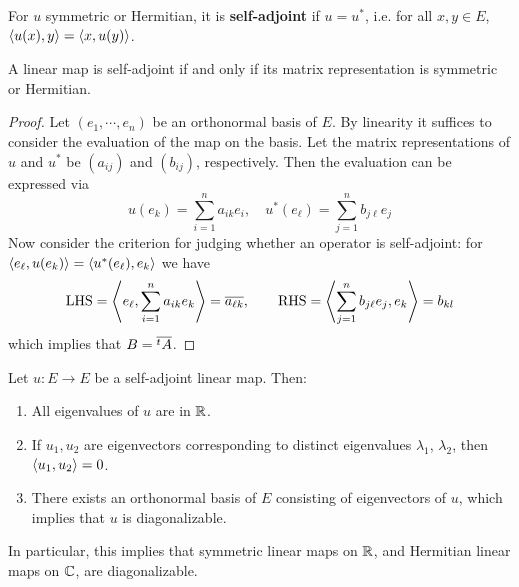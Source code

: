 \begin{definition}
    For $u$ symmetric or Hermitian, it is \textbf{self-adjoint} if $u = u^{\ast}$, i.e. for all $x, y \in E$, $\left\langle u(x), y \right\rangle = \left\langle x, u(y) \right\rangle$.
\end{definition}

\begin{proposition}
    A linear map is self-adjoint if and only if its matrix representation is symmetric or Hermitian.
\end{proposition}

\begin{proof}
    Let $(e_1, \cdots, e_n)$ be an orthonormal basis of $E$. By linearity it suffices to consider the evaluation of the map on the basis. Let the matrix representations of $u$ and $u^{\ast}$ be $(a_{ij})$ and $(b_{ij})$, respectively. Then the evaluation can be expressed via
    \[
        u(e_k) = \sum\limits_{i=1}^n a_{ik} e_i, \quad u^{\ast} (e_{\ell}) = \sum\limits_{j=1}^n b_{j \ell} e_j
    \]
    Now consider the criterion for judging whether an operator is self-adjoint: for $\left\langle e_{\ell}, u(e_k) \right\rangle = \left\langle u^{\ast}(e_{\ell}), e_k \right\rangle$ we have
    \[
        \text{LHS} = \left\langle e_{\ell}, \sum_{i=1}^n a_{ik} e_k \right\rangle = \overline{a_{\ell k}}, \qquad \text{RHS} = \left\langle \sum_{j=1}^n b_{j\ell} e_j, e_k \right\rangle = b_{kl}
    \]
    which implies that $B = \overline{^tA}$.
\end{proof}

\begin{theorem}\label{thm: Spectral}
    Let $u: E \to E$ be a self-adjoint linear map. Then:
    \begin{enumerate}[label=\roman*)]
        \item All eigenvalues of $u$ are in $\mathbb{R}$.
        \item If $u_1, u_2$ are eigenvectors corresponding to distinct eigenvalues $\lambda_1$, $\lambda_2$, then $\left\langle u_1, u_2 \right\rangle = 0$.
        \item There exists an orthonormal basis of $E$ consisting of eigenvectors of $u$, which implies that $u$ is diagonalizable.
    \end{enumerate}
\end{theorem}

\begin{remark}
    In particular, this implies that symmetric linear maps on $\mathbb{R}$, and Hermitian linear maps on $\mathbb{C}$, are diagonalizable.
\end{remark}

